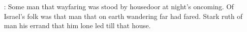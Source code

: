 \documentclass[12pt]{article}
\begin{document}






: Some man that wayfaring was stood by housedoor at night's
oncoming. Of Israel's folk was that man that on earth wandering far had
fared. Stark ruth of man his errand that him lone led till that house.
\end{document}
